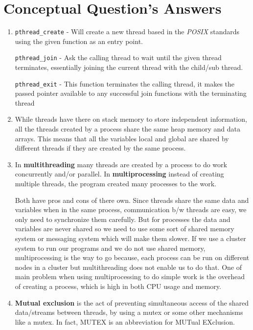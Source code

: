 \documentclass[11pt]{article}
\begin{document}
\section*{Conceptual Question's Answers}
\label{sec:org24dc06f}
\begin{enumerate}
\item \texttt{pthread\_create} - Will create a new thread based in the \emph{POSIX}
standards using the given function as an entry point.

\texttt{pthread\_join} - Ask the calling thread to wait until the given
thread terminates, essentially joining the current thread with the
child/sub thread.

\texttt{pthread\_exit} - This function terminates the calling thread, it
makes the passed pointer available to any successful join
functions with the terminating thread

\item While threads have there on stack memory to store independent
information, all the threads created by a process share the same
heap memory and data arrays. This means that all the variables
local and global are shared by different threads if they are
created by the same process.

\item In \textbf{multithreading} many threads are created by a process to do work
concurrently and/or parallel.  In \textbf{multiprocessing} instead of
creating multiple threads, the program created many processes to
the work.

Both have pros and cons of there own. Since threads share the same
data and variables when in the same process, communication b/w
threads are easy, we only need to synchronize them carefully. But
for processes the data and variables are never shared so we need
to use some sort of shared memory system or messaging system which
will make them slower. If we use a cluster system to run our
programs and we do not use shared memory, multiprocessing is the
way to go because, each process can be run on different nodes in a
cluster but multithreading does not enable us to do that. One of
main problem when using multiprocessing to do simple work is the
overhead of creating a process, which is high in both CPU usage
and memory.

\item \textbf{Mutual exclusion} is the act of preventing simultaneous access of
the shared data/streams between threads, by using a mutex or some
other mechanisms like a mutex. In fact, MUTEX is an abbreviation
for MUTual EXclusion.


\end{enumerate}
\end{document}
